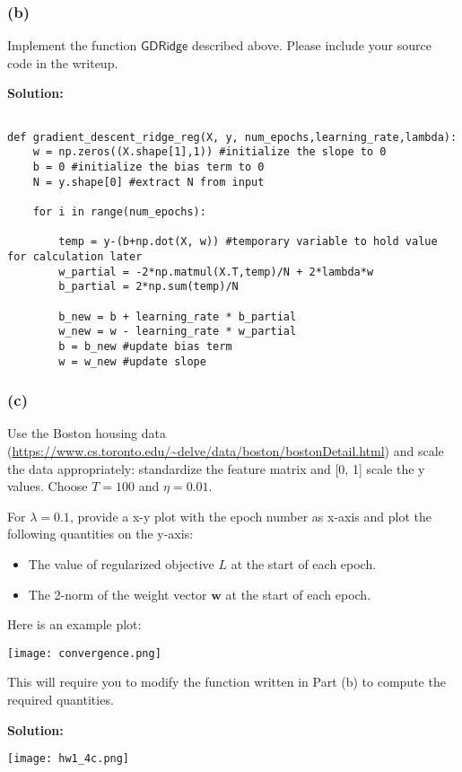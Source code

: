 \documentclass[11pt]{article}
\begin{document}
	\vfill
\subsubsection*{(b)}
	Implement the function $\mathsf{GDRidge}$ described above. Please include 
	your source code in the writeup.
	
	{\noindent \bf Solution: 
	\begin{lstlisting}

def gradient_descent_ridge_reg(X, y, num_epochs,learning_rate,lambda):
    w = np.zeros((X.shape[1],1)) #initialize the slope to 0
    b = 0 #initialize the bias term to 0
    N = y.shape[0] #extract N from input 
  
    for i in range(num_epochs):
      
        temp = y-(b+np.dot(X, w)) #temporary variable to hold value for calculation later 
        w_partial = -2*np.matmul(X.T,temp)/N + 2*lambda*w
        b_partial = 2*np.sum(temp)/N
       
        b_new = b + learning_rate * b_partial 
        w_new = w - learning_rate * w_partial
        b = b_new #update bias term
        w = w_new #update slope
	\end{lstlisting}
	}
	
	\vfill
\subsubsection*{(c)}
	Use the Boston housing data (\url{https://www.cs.toronto.edu/~delve/data/boston/bostonDetail.html}) and scale the data appropriately: standardize the feature
	matrix and [0, 1] scale the y values. Choose $T = 100$ and $\eta = 0.01$.

	 For $\lambda = 0.1$, 
	provide a x-y
	plot with the epoch number as x-axis and plot the following quantities on the y-axis:
	\begin{itemize}
		\item The value of regularized objective $L$ at the start of each epoch.
		\item The 2-norm of the weight vector $\mathbf{w}$ at the start of each epoch.
	\end{itemize}

	Here is an example plot:
	
	\texttt{[image: convergence.png]}
	
	This will require you to modify the function written in Part (b) to compute the required
	quantities.
	
	{\noindent \bf Solution: 
	
	
	\texttt{[image: hw1\_4c.png]}
	
	}
	
\end{document}
